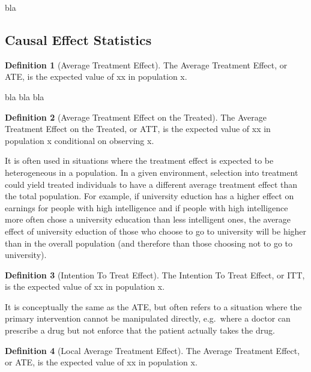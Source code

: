 \documentclass[
]{book}
\theoremstyle{definition}
\newtheorem{definition}{Definition}[chapter]
\theoremstyle{definition}
\theoremstyle{definition}
\theoremstyle{remark}
\begin{document}
bla

\hypertarget{causal-effect-statistics}{%
\subsection{Causal Effect Statistics}\label{causal-effect-statistics}}

\begin{definition}[Average Treatment Effect]
\protect\hypertarget{def:ate}{}{\label{def:ate} {} }The Average Treatment Effect, or ATE, is the expected value of xx in population x.
\end{definition}

bla bla bla

\begin{definition}[Average Treatment Effect on the Treated]
\protect\hypertarget{def:att}{}{\label{def:att} {} }The Average Treatment Effect on the Treated, or ATT, is the expected value of xx in population x conditional on observing x.
\end{definition}

It is often used in situations where the treatment effect is expected to be heterogeneous in a population. In a given environment, selection into treatment could yield treated individuals to have a different average treatment effect than the total population. For example, if university eduction has a higher effect on earnings for people with high intelligence and if people with high intelligence more often chose a university education than less intelligent ones, the average effect of university eduction of those who choose to go to university will be higher than in the overall population (and therefore than those choosing not to go to university).

\begin{definition}[Intention To Treat Effect]
\protect\hypertarget{def:itt}{}{\label{def:itt} {} }The Intention To Treat Effect, or ITT, is the expected value of xx in population x.
\end{definition}

It is conceptually the same as the ATE, but often refers to a situation where the primary intervention cannot be manipulated directly, e.g.~where a doctor can prescribe a drug but not enforce that the patient actually takes the drug.

\begin{definition}[Local Average Treatment Effect]
\protect\hypertarget{def:late}{}{\label{def:late} {} }The Average Treatment Effect, or ATE, is the expected value of xx in population x.
\end{definition}
\end{document}
